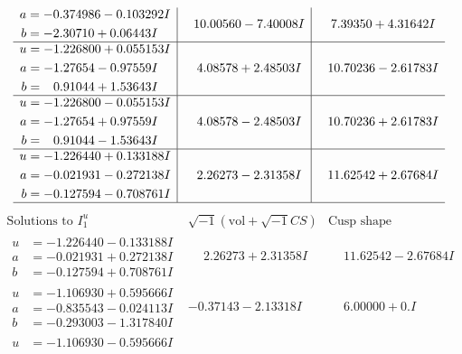 \documentclass[1p]{elsarticle_modified}
\theoremstyle{definition}
\newcommand{\I}{\sqrt{-1}}
\begin{document}
$$\begin{array}{c|c|c}
\begin{aligned}
a &= -0.374986 - 0.103292 I \\
b &= -2.30710 + 0.06443 I\end{aligned}
 & \phantom{-}10.00560 - 7.40008 I & \phantom{-}7.39350 + 4.31642 I \\ \hline\begin{aligned}
u &= -1.226800 + 0.055153 I \\
a &= -1.27654 - 0.97559 I \\
b &= \phantom{-}0.91044 + 1.53643 I\end{aligned}
 & \phantom{-}4.08578 + 2.48503 I & \phantom{-}10.70236 - 2.61783 I \\ \hline\begin{aligned}
u &= -1.226800 - 0.055153 I \\
a &= -1.27654 + 0.97559 I \\
b &= \phantom{-}0.91044 - 1.53643 I\end{aligned}
 & \phantom{-}4.08578 - 2.48503 I & \phantom{-}10.70236 + 2.61783 I \\ \hline\begin{aligned}
u &= -1.226440 + 0.133188 I \\
a &= -0.021931 - 0.272138 I \\
b &= -0.127594 - 0.708761 I\end{aligned}
 & \phantom{-}2.26273 - 2.31358 I & \phantom{-}11.62542 + 2.67684 I\\
 \hline 
 \end{array}$$\newpage$$\begin{array}{c|c|c}  
\text{Solutions to }I^u_{1}& \I (\text{vol} + \sqrt{-1}CS) & \text{Cusp shape}\\
 \hline 
\begin{aligned}
u &= -1.226440 - 0.133188 I \\
a &= -0.021931 + 0.272138 I \\
b &= -0.127594 + 0.708761 I\end{aligned}
 & \phantom{-}2.26273 + 2.31358 I & \phantom{-}11.62542 - 2.67684 I \\ \hline\begin{aligned}
u &= -1.106930 + 0.595666 I \\
a &= -0.835543 - 0.024113 I \\
b &= -0.293003 - 1.317840 I\end{aligned}
 & -0.37143 - 2.13318 I & \phantom{-}6.00000 + 0. I\phantom{ +0.000000I} \\ \hline\begin{aligned}
u &= -1.106930 - 0.595666 I \\

\end{aligned}
\end{array}$$
\end{document}
